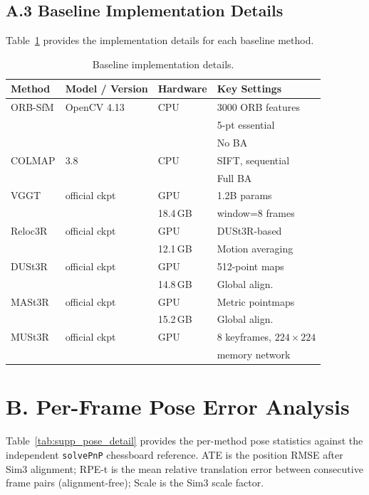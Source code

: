 \documentclass[review]{elsarticle}
\begin{document}
\subsection*{A.3 Baseline Implementation Details}

Table~\ref{tab:supp_baseline_config} provides the implementation details for each baseline method.

\begin{table}[h]
\centering
\caption{Baseline implementation details.}
\label{tab:supp_baseline_config}
\setlength{\tabcolsep}{3pt}
\renewcommand{\arraystretch}{1.05}
\begin{tabular}{llll}
\toprule
Method & Model / Version & Hardware & Key Settings \\
\midrule
ORB-SfM & OpenCV 4.13 & CPU & 3000 ORB features \\
 & & & 5-pt essential \\
 & & & No BA \\
COLMAP & 3.8 & CPU & SIFT, sequential \\
 & & & Full BA \\
VGGT & official ckpt & GPU & 1.2B params \\
 & & 18.4\,GB & window=8 frames \\
Reloc3R & official ckpt & GPU & DUSt3R-based \\
 & & 12.1\,GB & Motion averaging \\
DUSt3R & official ckpt & GPU & 512-point maps \\
 & & 14.8\,GB & Global align. \\
MASt3R & official ckpt & GPU & Metric pointmaps \\
 & & 15.2\,GB & Global align. \\
MUSt3R & official ckpt & GPU & 8 keyframes, $224{\times}224$ \\
 & & & memory network \\
\bottomrule
\end{tabular}
\end{table}

\section*{B. Per-Frame Pose Error Analysis}

Table~\ref{tab:supp_pose_detail} provides the per-method pose statistics against the independent \texttt{solvePnP} chessboard reference. ATE is the position RMSE after Sim3 alignment; RPE-t is the mean relative translation error between consecutive frame pairs (alignment-free); Scale is the Sim3 scale factor.
\end{document}
